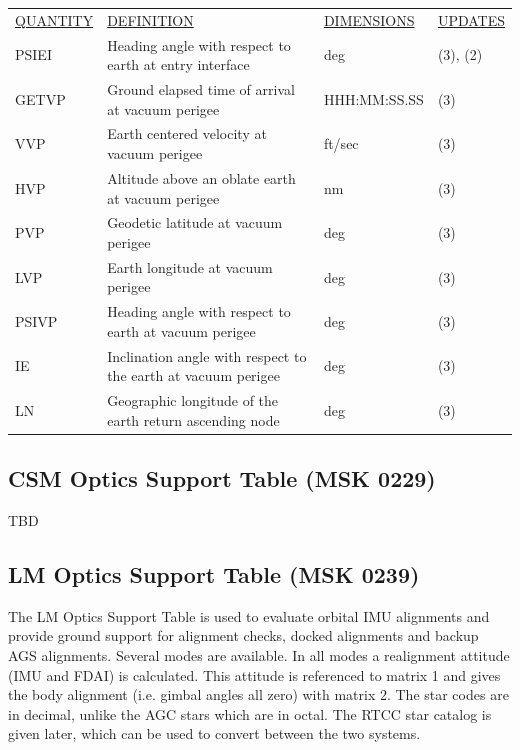 \documentclass[11pt]{article} %
\begin{document}
\begin{center}
\begin{tabular}{ L{2.4cm} L{5.1cm} L{3cm} L{3.8cm} }
\underline{QUANTITY} & \underline{DEFINITION} & \underline{DIMENSIONS} & \underline{UPDATES} \\
PSIEI & Heading angle with respect to earth at entry interface & deg & (3), (2)\\
GETVP & Ground elapsed time of arrival at vacuum perigee & HHH:MM:SS.SS & (3)\\
VVP & Earth centered velocity at vacuum perigee & ft/sec & (3)\\
HVP & Altitude above an oblate earth at vacuum perigee & nm & (3)\\
PVP & Geodetic latitude at vacuum perigee & deg & (3)\\
LVP & Earth longitude at vacuum perigee & deg & (3)\\
PSIVP & Heading angle with respect to earth at vacuum perigee & deg & (3)\\
IE & Inclination angle with respect to the earth at vacuum perigee & deg & (3)\\
LN & Geographic longitude of the earth return ascending node & deg & (3)\\
\end{tabular}
\end{center}

\newpage
\subsection{CSM Optics Support Table (MSK 0229)}

TBD

\newpage
\subsection{LM Optics Support Table (MSK 0239)}

The LM Optics Support Table is used to evaluate orbital IMU alignments and provide ground support for alignment checks, docked alignments and backup AGS alignments. Several modes are available. In all modes a realignment attitude (IMU and FDAI) is calculated. This attitude is referenced to matrix 1 and gives the body alignment (i.e. gimbal angles all zero) with matrix 2. The star codes are in decimal, unlike the AGC stars which are in octal. The RTCC star catalog is given later, which can be used to convert between the two systems.\\
\end{document}
